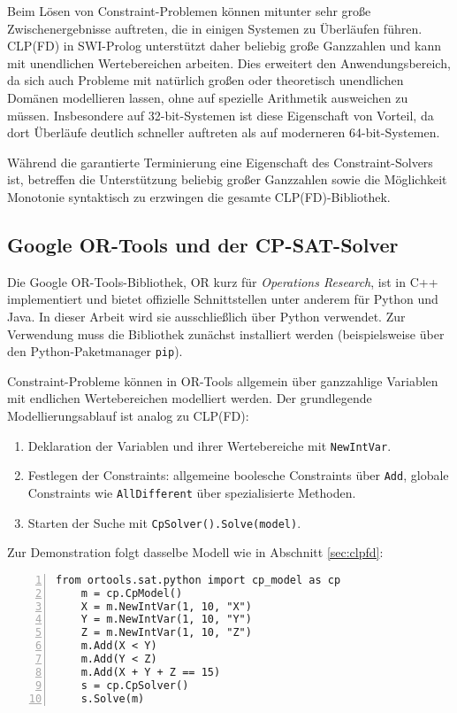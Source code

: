 \documentclass[12pt,a4paper]{article}
\begin{document}
Beim Lösen von Constraint-Problemen können mitunter sehr große Zwischenergebnisse auftreten, die in einigen Systemen zu Überläufen führen.
CLP(FD) in SWI-Prolog unterstützt daher beliebig große Ganzzahlen und kann mit unendlichen Wertebereichen arbeiten.
Dies erweitert den Anwendungsbereich, da sich auch Probleme mit natürlich großen oder theoretisch unendlichen Domänen modellieren lassen, ohne auf spezielle Arithmetik ausweichen zu müssen.
Insbesondere auf 32-bit-Systemen ist diese Eigenschaft von Vorteil, da dort Überläufe deutlich schneller auftreten als auf moderneren 64-bit-Systemen.

Während die garantierte Terminierung eine Eigenschaft des Constraint-Solvers ist, betreffen die Unterstützung beliebig großer Ganzzahlen sowie die Möglichkeit Monotonie syntaktisch zu erzwingen die gesamte CLP(FD)-Bibliothek.

\subsection{Google OR-Tools und der CP-SAT-Solver}
\label{sec:ortools}
Die Google OR-Tools-Bibliothek, \glqq OR\grqq{} kurz für \emph{Operations Research}, ist in C++ implementiert und bietet offizielle Schnittstellen unter anderem für Python und Java.
In dieser Arbeit wird sie ausschließlich über Python verwendet.
Zur Verwendung muss die Bibliothek zunächst installiert werden (beispielsweise über den Python-Paketmanager \texttt{pip}).

Constraint-Probleme können in OR-Tools allgemein über ganzzahlige Variablen mit endlichen Wertebereichen modelliert werden.
Der grundlegende Modellierungsablauf ist analog zu CLP(FD):

\begin{enumerate}
    \item Deklaration der Variablen und ihrer Wertebereiche mit \texttt{NewIntVar}.
    \item Festlegen der Constraints: allgemeine boolesche Constraints über \texttt{Add}, globale Constraints wie \texttt{AllDifferent} über spezialisierte Methoden.
    \item Starten der Suche mit \texttt{CpSolver().Solve(model)}.
\end{enumerate}

\noindent
Zur Demonstration folgt dasselbe Modell wie in Abschnitt \ref{sec:clpfd}:

\begin{Verbatim}[numbers=left, xleftmargin=5mm, frame=lines]
    from ortools.sat.python import cp_model as cp
    m = cp.CpModel()
    X = m.NewIntVar(1, 10, "X")
    Y = m.NewIntVar(1, 10, "Y")
    Z = m.NewIntVar(1, 10, "Z")
    m.Add(X < Y)
    m.Add(Y < Z)
    m.Add(X + Y + Z == 15)
    s = cp.CpSolver()
    s.Solve(m)
\end{Verbatim}
\end{document}
